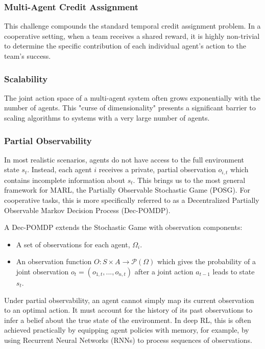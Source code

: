 \subsubsection{Multi-Agent Credit Assignment}
 This challenge compounds the standard temporal credit assignment problem. In a cooperative setting, when a team receives a shared reward, it is highly non-trivial to determine the specific contribution of each individual agent's action to the team's success.
\subsubsection{Scalability}
 The joint action space of a multi-agent system often grows exponentially with the number of agents. This "curse of dimensionality" presents a significant barrier to scaling algorithms to systems with a very large number of agents.
\subsubsection{Partial Observability}
In most realistic scenarios, agents do not have access to the full environment state $s_t$. Instead, each agent $i$ receives a private, partial observation $o_{i,t}$ which contains incomplete information about $s_t$. This brings us to the most general framework for MARL, the Partially Observable Stochastic Game (POSG). For cooperative tasks, this is more specifically referred to as a Decentralized Partially Observable Markov Decision Process (Dec-POMDP).

\begin{definition}
A Dec-POMDP extends the Stochastic Game with observation components:
\begin{itemize}
    \item A set of observations for each agent, $\Omega_i$.
    \item An observation function $O: S \times A \to \mathcal{P}(\Omega)$ which gives the probability of a joint observation $o_t = (o_{1,t}, ..., o_{n,t})$ after a joint action $a_{t-1}$ leads to state $s_t$.
\end{itemize}
\end{definition}

Under partial observability, an agent cannot simply map its current observation to an optimal action. It must account for the history of its past observations to infer a belief about the true state of the environment. In deep RL, this is often achieved practically by equipping agent policies with memory, for example, by using Recurrent Neural Networks (RNNs) to process sequences of observations.\parencite{ma_deep_rl_challenges_and_applications}

